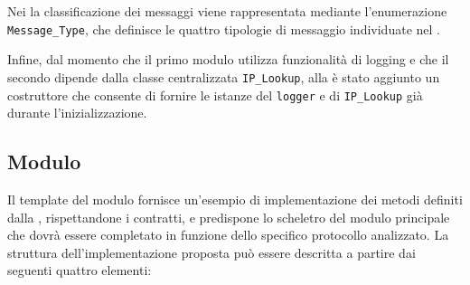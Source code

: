 Nei \templates{} la classificazione dei messaggi viene rappresentata mediante l'enumerazione \texttt{Message\_Type}, che definisce le quattro tipologie di messaggio individuate nel \schema{}.



Infine, dal momento che il primo modulo utilizza funzionalità di logging e che il secondo dipende dalla classe centralizzata \texttt{IP\_Lookup}, alla \interface{} è stato aggiunto un costruttore che consente di fornire le istanze del \texttt{logger} e di \texttt{IP\_Lookup} già durante l'inizializzazione.


\subsection{Modulo \botnet{}} %



Il template del modulo \botnet{} fornisce un'esempio di implementazione dei metodi definiti dalla \interface{}, rispettandone i contratti, e predispone lo scheletro del modulo principale che dovrà essere completato in funzione dello specifico protocollo analizzato. La struttura dell'implementazione proposta può essere descritta a partire dai seguenti quattro elementi:



